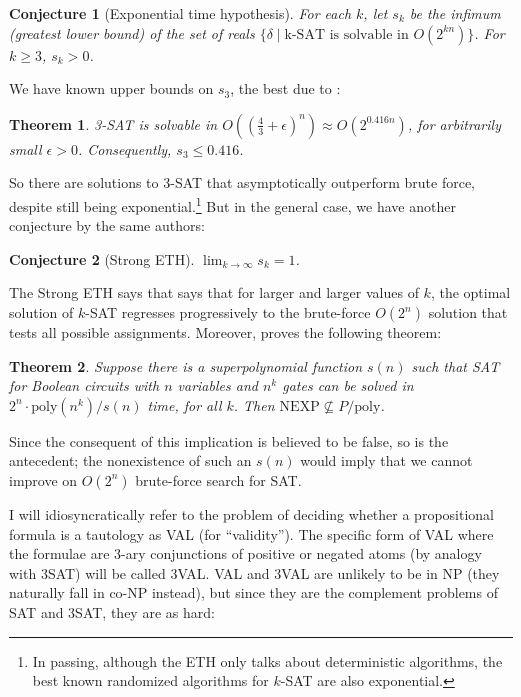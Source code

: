 \documentclass[letterpaper,12pt]{article}
\newtheorem{conjecture}{Conjecture}
\newtheorem{theorem}{Theorem}
\begin{document}
\begin{conjecture}[Exponential time hypothesis]
For each $k$, let $s_k$ be the infimum (greatest lower bound) of the set of reals $\{\delta \mid \text{k-SAT is solvable in } O(2^{kn})\}$. For $k \geq 3$, $s_k > 0$.
\end{conjecture}

We have known upper bounds on $s_3$, the best due to \cite{DBLP:journals/corr/abs-1008-4067}:

\begin{theorem}
\label{3SatBound}
3-SAT is solvable in $O((\frac{4}{3} + \epsilon)^{n}) \approx O(2^{0.416n})$, for arbitrarily small $\epsilon > 0$. Consequently, $s_3 \leq 0.416$.
\end{theorem}

So there are solutions to 3-SAT that asymptotically outperform brute force, despite still being exponential.\footnote{In passing, although the ETH only talks about deterministic algorithms, the best known randomized algorithms for $k$-SAT are also exponential.} But in the general case, we have another conjecture by the same authors:

\begin{conjecture}[Strong ETH]
$\lim_{k \to \infty} s_k = 1$.
\end{conjecture}

The Strong ETH says that  says that for larger and larger values of $k$, the optimal solution of $k$-SAT regresses progressively to the brute-force $O(2^n)$ solution that tests all possible assignments. Moreover, \cite{Williams:2010:IES:1806689.1806723} proves the following theorem:

\begin{theorem}
Suppose there is a superpolynomial function $s(n)$ such that SAT for Boolean circuits with $n$ variables and $n^k$ gates can be solved in $2^n \cdot \text{poly}(n^k)/s(n)$ time, for all $k$. Then $\text{NEXP} \not \subseteq P/\text{poly}$.
\end{theorem}

Since the consequent of this implication is believed to be false, so is the antecedent; the nonexistence of such an $s(n)$ would imply that we cannot improve on $O(2^n)$ brute-force search for SAT.

I will idiosyncratically refer to the problem of deciding whether a propositional formula is a tautology as VAL (for ``validity''). The specific form of VAL where the formulae are 3-ary conjunctions of positive or negated atoms (by analogy with 3SAT) will be called 3VAL. VAL and 3VAL are unlikely to be in NP (they naturally fall in co-NP instead), but since they are the complement problems of SAT and 3SAT, they are as hard:
\end{document}

